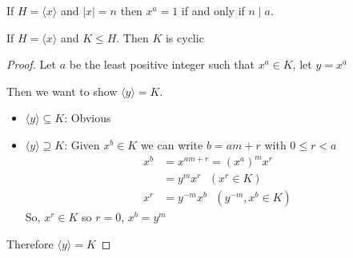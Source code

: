 \begin{theorem}
  If $H = \langle x \rangle$ and $|x| = n$ then $x^a = 1$ if and only if $n \mid a$.
\end{theorem}

\begin{theorem}
  If $H = \langle x \rangle$ and $K \leq H$. Then $K$ is cyclic 
\end{theorem}

\begin{proof}
  Let $a$ be the least positive integer such that $x^a \in K$, let $y = x^a$
  
  Then we want to show $\langle y \rangle = K$. 
  \begin{itemize}
    \item $\langle y \rangle \subseteq K$: Obvious
    \item $\langle y \rangle \supseteq K$: Given $x^b \in K$ we can write $b = am + r$ with $0 \leq r < a$ 
    \begin{align*}
      x^b &= x^{am+r} = (x^a)^mx^r \\
    &= y^m x^r \text{ }(x^r \in K) \\
    x^r &= y^{-m}x^b\text{ }(y^{-m}, x^b \in K)
    \end{align*}
    So, $x^r \in K$ so $r = 0$, $x^b = y^m$
  \end{itemize}
  Therefore $\langle y \rangle = K$
\end{proof}
